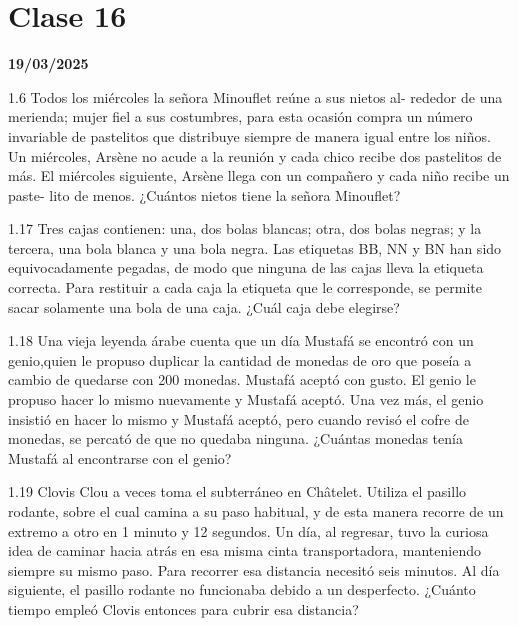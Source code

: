 \section{Clase 16}
\textbf{19/03/2025}

1.6 Todos los miércoles la señora Minouflet reúne a sus nietos al- rededor de una merienda; mujer fiel a sus costumbres, para esta ocasión compra un número invariable de pastelitos que distribuye siempre de manera igual entre los niños. Un miércoles, Arsène no acude a la reunión y cada chico recibe dos pastelitos de más. El miércoles siguiente, Arsène llega con un compañero y cada niño recibe un paste- lito de menos. ¿Cuántos nietos tiene la señora Minouflet?

1.17 Tres cajas contienen: una, dos bolas blancas; otra, dos bolas negras; y la tercera, una bola blanca y una bola negra. Las etiquetas BB, NN y BN han sido equivocadamente pegadas, de modo que ninguna de las cajas lleva la etiqueta correcta. Para restituir a cada caja la etiqueta que le corresponde, se permite sacar solamente una bola de una caja. ¿Cuál caja debe elegirse?

1.18 Una vieja leyenda árabe cuenta que un día Mustafá se encontró con un genio,quien le propuso duplicar la cantidad de monedas de oro que poseía a cambio de quedarse con 200 monedas. Mustafá aceptó con gusto. El genio le propuso hacer lo mismo nuevamente y Mustafá aceptó. Una vez más, el genio insistió en hacer lo mismo y Mustafá aceptó, pero cuando revisó el cofre de monedas, se percató de que no quedaba ninguna. ¿Cuántas monedas tenía Mustafá al encontrarse con el genio?

1.19 Clovis Clou a veces toma el subterráneo en Châtelet. Utiliza el pasillo rodante, sobre el cual camina a su paso habitual, y de esta manera recorre de un extremo a otro en 1 minuto y 12 segundos. Un día, al regresar, tuvo la curiosa idea de caminar hacia atrás en esa misma cinta transportadora, manteniendo siempre su mismo paso. Para recorrer esa distancia necesitó seis minutos. Al día siguiente, el pasillo rodante no funcionaba debido a un desperfecto. ¿Cuánto tiempo empleó Clovis entonces para cubrir esa distancia?